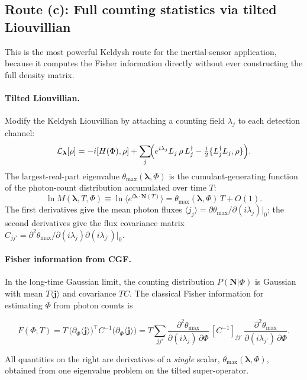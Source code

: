 \documentclass[11pt]{article}
\begin{document}
\subsection{Route (c): Full counting statistics via tilted Liouvillian}
\label{sec:route_c_FCS}

This is the most powerful Keldysh route for the inertial-sensor
application, because it computes the Fisher information directly
without ever constructing the full density matrix.

\paragraph{Tilted Liouvillian.}  Modify the Keldysh Liouvillian by
attaching a counting field $\lambda_j$ to each detection channel:
\begin{equation}
  \mathcal{L}_{\boldsymbol\lambda}[\rho]
  = -i[H(\Phi),\rho]
  + \sum_j\!\Bigl(e^{i\lambda_j}L_j\,\rho\,L_j^\dagger
    - \tfrac{1}{2}\{L_j^\dagger L_j,\rho\}\Bigr).
  \label{eq:tilted_L}
\end{equation}
The largest-real-part eigenvalue $\theta_{\max}(\boldsymbol\lambda,\Phi)$
is the cumulant-generating function of the photon-count distribution
accumulated over time $T$:
\begin{equation}
  \ln M(\boldsymbol\lambda, T, \Phi)
  \equiv \ln\langle e^{i\boldsymbol\lambda\cdot\mathbf{N}(T)}\rangle
  = \theta_{\max}(\boldsymbol\lambda,\Phi)\,T + O(1).
\end{equation}
The first derivatives give the mean photon fluxes
$\langle j_j\rangle = \partial\theta_{\max}/\partial(i\lambda_j)|_0$;
the second derivatives give the flux covariance matrix
$C_{jj'} = \partial^2\theta_{\max}/\partial(i\lambda_j)\partial(i\lambda_{j'})|_0$.

\paragraph{Fisher information from CGF.}  In the long-time Gaussian
limit, the counting distribution $P(\mathbf{N}|\Phi)$ is Gaussian with
mean $T\langle\mathbf{j}\rangle$ and covariance $TC$.  The classical
Fisher information for estimating $\Phi$ from photon counts is
\begin{keyresult}
\begin{equation}
  \boxed{F(\Phi; T)
  = T\,\bigl(\partial_\Phi\langle\mathbf{j}\rangle\bigr)^{\!\top}
          C^{-1}
          \bigl(\partial_\Phi\langle\mathbf{j}\rangle\bigr)
  = T\sum_{jj'}
    \frac{\partial^2\theta_{\max}}{\partial(i\lambda_j)\,\partial\Phi}
    \,[C^{-1}]_{jj'}\,
    \frac{\partial^2\theta_{\max}}{\partial(i\lambda_{j'})\,\partial\Phi}.}
  \label{eq:FI_from_CGF}
\end{equation}
\end{keyresult}
All quantities on the right are derivatives of a \emph{single} scalar,
$\theta_{\max}(\boldsymbol\lambda,\Phi)$, obtained from one
eigenvalue problem on the tilted super-operator.
\end{document}
